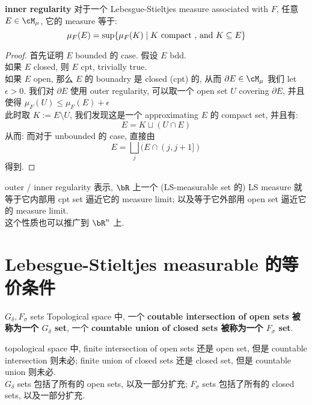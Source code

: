 \documentclass[lang=cn,11pt]{elegantbook}
\begin{document}
\begin{theorem}{\textbf{inner regularity}}
\label{inner regularity}
对于一个 Lebesgue-Stieltjes measure associated with $F$, 任意 $E \in \cM_\mu$, 它的 measure 等于:
\begin{equation}
    \mu_F(E) = \sup \{ \mu_F(K) \mid  K \text{ compact , and } K \subseteq E  \}
\end{equation}
\end{theorem}
\begin{proof}
    首先证明 $E$ bounded 的 case. 假设 $E$ bdd. \\
    如果 $E$ closed, 则 $E$ cpt, trivially true. \\
    如果 $E$ open, 那么 $E$ 的 bounadry 是 closed (cpt) 的, 从而 $\partial E \in \cM_\mu$ 
    我们 let $\epsilon >0$. 我们对 $\partial E$ 使用 outer regularity, 可以取一个 open set $U$ covering $\partial E$, 并且使得 $\mu_F(U) \leq \mu_F(E) + \epsilon$\\
    此时取 $K := E \setminus U$, 我们发现这是一个 approximating $E$ 的 compact set, 并且有:
    $$
    E = K \sqcup (U \cap E)
    $$
从而:
而对于 unbounded 的 case, 直接由 
$$
E  = \bigsqcup_j (E \cap (j,j+1])
$$得到.
\end{proof}
\begin{remark}
outer / inner regularity 表示, $\bR$ 上一个 (LS-measurable set 的) LS measure 就等于它内部用 cpt set 逼近它的 measure limit; 以及等于它外部用 open set 逼近它的 measure limit.\\
这个性质也可以推广到 $\bR^n$ 上.
\end{remark}




\section{Lebesgue-Stieltjes measurable 的等价条件}
\begin{definition}{$G_\delta, F_\sigma$ sets}
Topological space 中, 一个 \textbf{coutable intersection of open sets 被称为一个 $G_\delta$ set}, 一个 \textbf{countable union of closed sets 被称为一个 $F_\sigma$ set}.
\end{definition}
\begin{remark}
    topological space 中, finite intersection of open sets 还是 open set, 但是 countable intersection 则未必; finite union of closed sets 还是 closed set, 但是 countable union 则未必.\\
$G_\delta$ sets 包括了所有的 open sets, 以及一部分扩充; $F_\sigma$ sets 包括了所有的 closed sets, 以及一部分扩充.
\end{remark}
\end{document}
